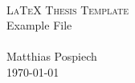 




\begin{titlepage}
   \mbox{}\vspace{5\baselineskip}\\
   \rmfamily\huge
   \centering
   \textsc{\LaTeX{} Thesis Template} \\[2ex]
   Example File
   \rmfamily\Large
   \vspace{1\baselineskip}\\
   \mbox{}
   \vspace{5\baselineskip}\\
   \rmfamily\Large
   Matthias Pospiech
   \vspace{1\baselineskip}\\
   \today
\end{titlepage}
 



% 
